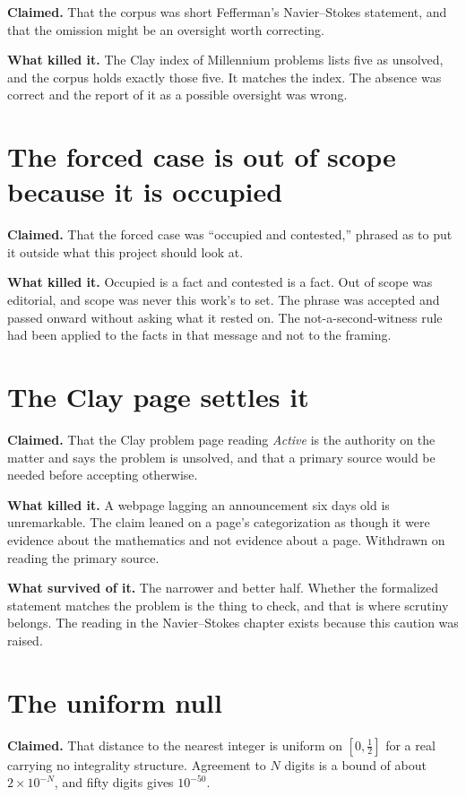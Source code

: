 \textbf{Claimed.} That the corpus was short Fefferman's Navier--Stokes statement, and that the
omission might be an oversight worth correcting.

\textbf{What killed it.} The Clay index of Millennium problems lists five as unsolved, and the
corpus holds exactly those five. It matches the index. The absence was correct and the report of it
as a possible oversight was wrong.

\section{The forced case is out of scope because it is occupied}

\textbf{Claimed.} That the forced case was ``occupied and contested,'' phrased as to put it
outside what this project should look at.

\textbf{What killed it.} Occupied is a fact and contested is a fact. Out of scope was editorial, and
scope was never this work's to set. The phrase was accepted and passed onward
without asking what it rested on. The not-a-second-witness rule had been applied to the facts in
that message and not to the framing.

\section{The Clay page settles it}

\textbf{Claimed.} That the Clay problem page reading \emph{Active} is the
authority on the matter and says the problem is unsolved, and that a primary source would be needed
before accepting otherwise.

\textbf{What killed it.} A webpage lagging an announcement six days old is unremarkable. The claim
leaned on a page's categorization as though it were evidence about the mathematics and not
evidence about a page. Withdrawn on reading the primary source.

\textbf{What survived of it.} The narrower and better half. Whether the formalized statement matches
the problem is the thing to check, and that is where scrutiny belongs. The reading in the
Navier--Stokes chapter exists because this caution was raised.

\section{The uniform null}

\textbf{Claimed.} That distance to the nearest integer is uniform on
$[0,\tfrac12]$ for a real carrying no integrality structure. Agreement to $N$ digits is a bound
of about $2\times10^{-N}$, and fifty digits gives $10^{-50}$.

